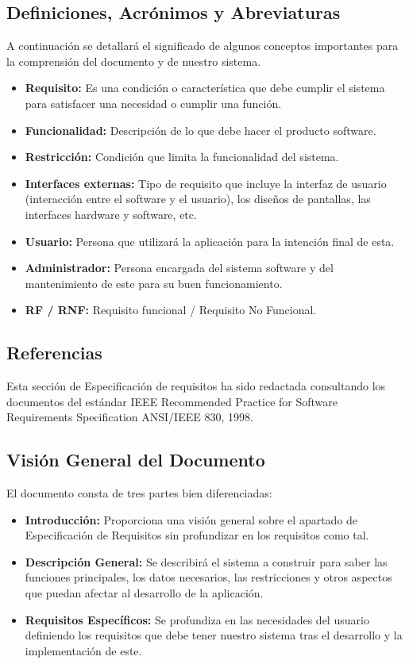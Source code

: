 \subsection{Definiciones, Acrónimos y Abreviaturas}
A continuación se detallará el significado de algunos conceptos importantes para la comprensión del documento y de nuestro sistema.
\begin{itemize}
    \item \textbf{Requisito:} Es una condición o característica que debe cumplir el sistema para satisfacer una necesidad o cumplir una función.
    \item \textbf{Funcionalidad:} Descripción de lo que debe hacer el producto software.
    \item \textbf{Restricción:} Condición que limita la funcionalidad del sistema.
    \item \textbf{Interfaces externas:} Tipo de requisito que incluye la interfaz de usuario (interacción entre el software y el usuario), los diseños de pantallas, las interfaces hardware y software, etc.
    \item \textbf{Usuario: }Persona que utilizará la aplicación para la intención final de esta.
    \item \textbf{Administrador: } Persona encargada del sistema software y del mantenimiento de este para su buen funcionamiento.
    \item \textbf{RF / RNF:} Requisito funcional / Requisito No Funcional.
\end{itemize}

\subsection{Referencias}
Esta sección de Especificación de requisitos ha sido redactada consultando los documentos del estándar IEEE Recommended Practice for Software Requirements Specification ANSI/IEEE 830, 1998.

\subsection{Visión General del Documento}
El documento consta de tres partes bien diferenciadas:
\begin{itemize}
    \item \textbf{Introducción:} Proporciona una visión general sobre el apartado de Especificación de Requisitos sin profundizar en los requisitos como tal.
    \item \textbf{Descripción General:} Se describirá el sistema a construir para saber las funciones principales, los datos necesarios, las restricciones y otros aspectos que puedan afectar al desarrollo de la aplicación.
    \item \textbf{Requisitos Específicos:} Se profundiza en las necesidades del usuario definiendo los requisitos que debe tener nuestro sistema tras el desarrollo y la implementación de este.
\end{itemize}

